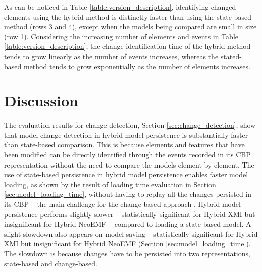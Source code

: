 \documentclass{llncs}
\begin{document}
As can be noticed in Table \ref{table:version_description}, identifying changed elements using the hybrid method is distinctly faster than using the state-based method (rows 3 and 4), except when the models being compared are small in size (row 1). Considering the increasing number of elements and events in Table \ref{table:version_description}, the change identification time of the hybrid method tends to grow linearly as the number of events increases, whereas the stated-based method tends to grow exponentially as the number of elements increases.


\vspace{-10pt}
\section{Discussion}
\label{sec:discussion}

\vspace{-10pt}
The evaluation results for change detection, Section \ref{sec:change_detection}, show that model change detection in hybrid model persistence is substantially faster than state-based comparison. This is because elements and features that have been modified can be directly identified through the events recorded in its CBP representation without the need to compare the models element-by-element. The use of state-based persistence in hybrid model persistence enables faster model loading, as shown by the result of loading time evaluation in Section \ref{sec:model_loading_time}, without having to replay all the changes persisted in its CBP -- the main challenge for the change-based approach \cite{yohannis2018towards,mens2002state}. 
Hybrid model persistence performs slightly slower -- statistically significant for Hybrid XMI but insignificant for Hybrid NeoEMF -- compared to loading a state-based model. A slight slowdown also appears on model saving -- statistically significant for Hybrid XMI but insignificant for Hybrid NeoEMF (Section \ref{sec:model_loading_time}). The slowdown is because changes have to be persisted into two representations, state-based and change-based. 
\end{document}

